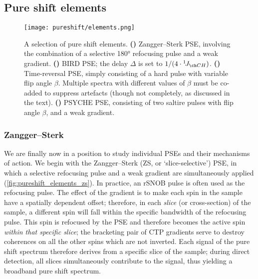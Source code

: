 \subsection{Pure shift elements}
\label{subsec:pureshift__elements}

\begin{figure}[htbp]
    \centering
    \texttt{[image: pureshift/elements.png]}%
    {\label{fig:pureshift_elements_zs}}%
    {\label{fig:pureshift_elements_bird}}%
    {\label{fig:pureshift_elements_tr}}%
    {\label{fig:pureshift_elements_psyche}}%
    \caption[Pure shift elements]{
        A selection of pure shift elements.
        \textbf{()} Zangger--Sterk PSE\autocite{Zangger1997JMR}, involving the combination of a selective \ang{180} refocusing pulse and a weak gradient.
        \textbf{()} BIRD PSE\autocite{Garbow1982CPL,Aguilar2011ACIE}; the delay $\Delta$ is set to $1/(4 \cdot \oneJ{CH})$.
        \textbf{()} Time-reversal PSE\autocite{Sorensen1985JACS}, simply consisting of a hard pulse with variable flip angle $\beta$. Multiple spectra with different values of $\beta$ must be co-added to suppress artefacts (though not completely, as discussed in the text).
        \textbf{()} PSYCHE PSE\autocite{Foroozandeh2014ACIE}, consisting of two saltire pulses\autocite{Foroozandeh2018CEJ,Foroozandeh2020JMR} with flip angle $\beta$, and a weak gradient.
    }
    \label{fig:pureshift_elements}
\end{figure}


\subsubsection{Zangger--Sterk}

We are finally now in a position to study individual PSEs and their mechanisms of action.
We begin with the Zangger--Sterk (ZS, or `slice-selective') PSE\autocite{Zangger1997JMR}, in which a selective refocusing pulse and a weak gradient are simultaneously applied (\cref{fig:pureshift_elements_zs}).
In practice, an rSNOB pulse\autocite{Kupce1995JMRSB} is often used as the refocusing pulse.
The effect of the gradient is to make each spin in the sample have a spatially dependent offset; therefore, in each \textit{slice} (or cross-section) of the sample, a different spin will fall within the specific bandwidth of the refocusing pulse.
This spin is refocused by the PSE and therefore becomes the active spin \textit{within that specific slice}; the bracketing pair of CTP gradients serve to destroy coherences on all the other spins which are not inverted.
Each signal of the pure shift spectrum therefore derives from a specific slice of the sample; during direct detection, all slices simultaneously contribute to the signal, thus yielding a broadband pure shift spectrum.

